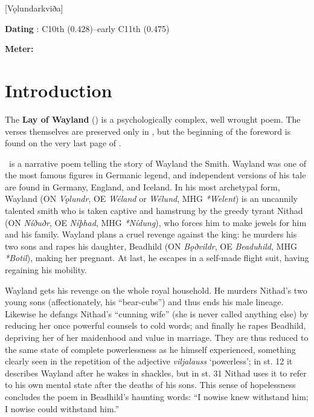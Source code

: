 [Vǫlundarkviða]
\def\thisBookCode{Volundarkvida}

\begin{flushright}%
\textbf{Dating} \parencite{Sapp2022}: C10th (0.428)–early C11th (0.475)

\textbf{Meter:} \Fornyrdislag%
\end{flushright}%

\section{Introduction}

The \textbf{Lay of Wayland} (\Volundarkvida) is a psychologically complex, well wrought poem.  The verses themselves are preserved only in \Regius, but the beginning of the foreword is found on the very last page of \AM.

\Volundarkvida\ is a narrative poem telling the story of Wayland the Smith.  Wayland was one of the most famous figures in Germanic legend, and independent versions of his tale are found in Germany, England, and Iceland.  In his most archetypal form, Wayland (ON \emph{Vǫlundr}, OE \emph{Wéland} or \emph{Wélund}, MHG \emph{*Welent}) is an uncannily talented smith who is taken captive and hamstrung by the greedy tyrant Nithad (ON \emph{Níðuðr}, OE \emph{Níþhad}, MHG \emph{*Nídung}), who forces him to make jewels for him and his family.  Wayland plans a cruel revenge against the king: he murders his two sons and rapes his daughter, Beadhild (ON \emph{Bǫðvildr}, OE \emph{Beaduhild}, MHG \emph{*Botil}), making her pregnant.  At last, he escapes in a self-made flight suit, having regaining his mobility.

Wayland gets his revenge on the whole royal household. He murders Nithad’s two young sons (affectionately, his “bear-cubs”) and thus ends his male lineage. Likewise he defangs Nithad’s “cunning wife” (she is never called anything else) by reducing her once powerful counsels to cold words; and finally he rapes Beadhild, depriving her of her maidenhood and value in marriage. They are thus reduced to the same state of complete powerlessness as he himself experienced, something clearly seen in the repetition of the adjective \emph{viljalauss} ‘powerless’; in st. 12 it describes Wayland after he wakes in shackles, but in st. 31 Nithad uses it to refer to his own mental state after the deaths of his sons. This sense of hopelessness concludes the poem in Beadhild’s haunting words: “I nowise knew withstand him; I nowise could withstand him.”

